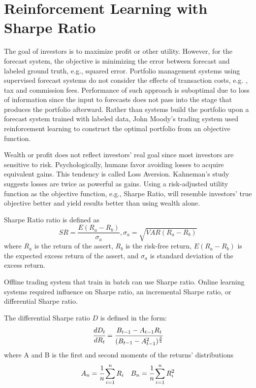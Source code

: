 \section{Reinforcement Learning with Sharpe Ratio}
The goal of investors is to maximize profit or other utility. However, for the forecast system, the objective is minimizing the error between forecast and labeled ground truth, e.g., squared error. Portfolio management systems using supervised forecast systems do not consider the effects of transaction costs, e.g. , tax and commission fees. Performance of such approach is suboptimal due to loss of information since the input to forecasts does not pass into the stage that produces the portfolio afterward.
Rather than systems build the portfolio upon a forecast system trained with labeled data, John Moody's trading system used reinforcement learning to construct the optimal portfolio from an objective function\cite{618952,moody1998performance}.
\par
Wealth or profit does not reflect investors' real goal since most investors are sensitive to risk. Psychologically, humans favor avoiding losses to acquire equivalent gains. This tendency is called Loss Aversion.\cite{kahneman2000analysis} Kahneman's study suggests losses are twice as powerful as gains\cite{Tversky1992}. Using a risk-adjusted utility function as the objective function, e.g., Sharpe Ratio, will resemble investors' true objective better and yield results better than using wealth alone.
\par
Sharpe Ratio ratio is defined as 
\[ SR = \frac{E(R_a - R_b)}{\sigma_a},
\sigma_a = \sqrt{VAR(R_a-R_b)}\]
where \(R_a\) is the return of the assert, 
\(R_b\) is the risk-free return,
\(E(R_a - R_b)\) is the expected excess return of the assert,
and \(\sigma_a\) is standard deviation of the excess return.
\par
Offline trading system that train in batch can use Sharpe ratio. 
Online learning systems required influence on Sharpe ratio, an incremental Sharpe ratio, or differential Sharpe ratio.

The differential Sharpe ratio \(D\) is defined in the form:
\[
\cfrac{d D_t}{d R_t} = 
\cfrac{B_{t-1}-A_{t-1} R_t}{(B_{t-1}-A_{t-1}^2)^\frac{3}{2}}
\]
where
A and B is the first and second moments of the returns' distributions
\[ A_n = \cfrac{1}{n}\sum_{i=1}^nR_i\quad
B_n = \cfrac{1}{n}\sum_{i=1}^nR_i^2
\]